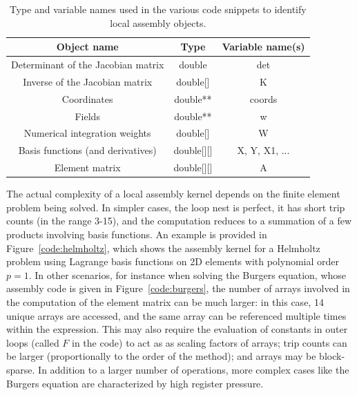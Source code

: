 \documentclass[conference]{IEEEtran}
\begin{document}
\begin{table}[h]
\begin{center}
\begin{tabulary}{1.0\columnwidth}{C|C|C}
\hline
Object name & Type & Variable name(s) \\\hline
Determinant of the Jacobian matrix & double & det  \\ 
Inverse of the Jacobian matrix & double[] & K \\ 
Coordinates & double** & coords\\ 
Fields & double** & w \\ 
Numerical integration weights & double[] & W \\ 
Basis functions (and derivatives) & double[][] & X, Y, X1, ... \\ 
Element matrix & double[][] & A\\ \hline
\end{tabulary}
\end{center}
\caption{Type and variable names used in the various code snippets to identify local assembly objects.}
\label{table:map-name-letters}
\end{table}

The actual complexity of a local assembly kernel depends on the finite element problem being solved. In simpler cases, the loop nest is perfect, it has short trip counts (in the range 3-15), and the computation reduces to a summation of a few products involving basis functions. An example is provided in Figure~\ref{code:helmholtz}, which shows the assembly kernel for a Helmholtz problem using Lagrange basis functions on 2D elements with polynomial order $p=1$. In other scenarios, for instance when solving the Burgers equation, whose assembly code is given in Figure~\ref{code:burgers}, the number of arrays involved in the computation of the element matrix can be much larger: in this case, 14 unique arrays are accessed, and the same array can be referenced multiple times within the expression. This may also require the evaluation of constants in outer loops (called $F$ in the code) to act as as scaling factors of arrays; trip counts can be larger (proportionally to the order of the method); and arrays may be block-sparse. In addition to a larger number of operations, more complex cases like the Burgers equation are characterized by high register pressure. 
\end{document}
